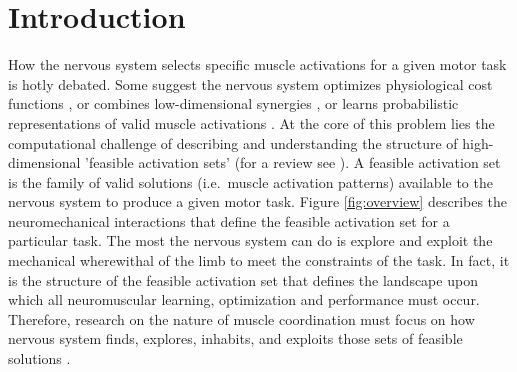 \documentclass[10pt,letterpaper]{article}
\begin{document}
\section*{Introduction}
How the nervous system selects specific muscle activations for a given motor task is hotly debated. Some suggest the nervous system optimizes physiological cost functions \cite{Chao1978Graphical,Prilutsky2000Muscle,scott2004optimal,todorov2002optimal,crowninshield1981physiologically,higginson2005simulated}, or combines low-dimensional synergies \cite{kutch2012challenges,steele2013number,bizzi2013neural,tresch2009case,dingwell2010walkingvariability,racz2013spatiotemporal,steele2015consequences,alessandro2013musclesynergies}, or learns probabilistic representations of valid muscle activations \cite{kording2004bayesian, Kording2014130, berniker2013examination,sanger2011distributed}.
At the core of this problem lies the computational challenge of describing and understanding the structure of high-dimensional 'feasible activation sets' (for a review see \cite{valero-cuevas2015fundamentals}). A feasible activation set is the family of valid solutions (i.e.\, muscle activation patterns) available to the nervous system to produce a given motor task.  Figure \ref{fig:overview} describes the neuromechanical interactions that define the feasible activation set for a particular task. The most the nervous system can do is explore and exploit the mechanical wherewithal of the limb to meet the constraints of the task. In fact, it is the structure of the feasible activation set that defines the landscape upon which all neuromuscular learning, optimization and performance must occur. Therefore, research on the nature of muscle coordination must  focus on how nervous system finds, explores, inhabits, and exploits those sets of feasible solutions \cite{kutch2012challenges,steele2013number,bizzi2013neural,tresch2009case,dingwell2010walkingvariability,racz2013spatiotemporal,steele2015consequences}.
\end{document}
